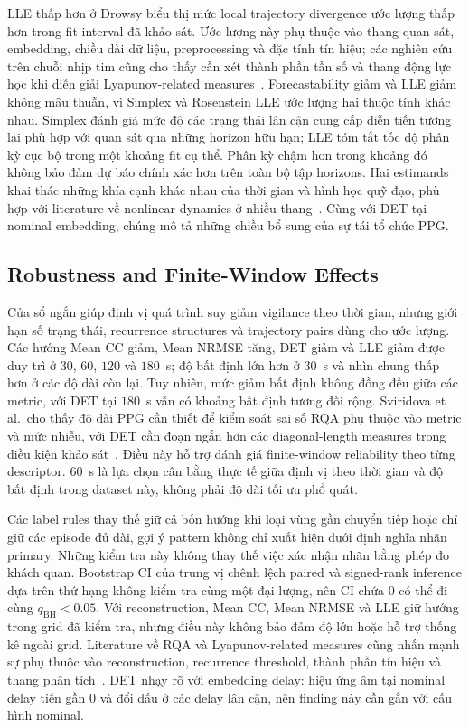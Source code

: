 LLE thấp hơn ở Drowsy biểu thị mức local trajectory divergence ước lượng thấp hơn trong fit interval đã khảo sát. Ước lượng này phụ thuộc vào thang quan sát, embedding, chiều dài dữ liệu, preprocessing và đặc tính tín hiệu; các nghiên cứu trên chuỗi nhịp tim cũng cho thấy cần xét thành phần tần số và thang động lực học khi diễn giải Lyapunov-related measures~\cite{yeragani2004,hu2009}. Forecastability giảm và LLE giảm không mâu thuẫn, vì Simplex và Rosenstein LLE ước lượng hai thuộc tính khác nhau. Simplex đánh giá mức độ các trạng thái lân cận cung cấp diễn tiến tương lai phù hợp với quan sát qua những horizon hữu hạn; LLE tóm tắt tốc độ phân kỳ cục bộ trong một khoảng fit cụ thể. Phân kỳ chậm hơn trong khoảng đó không bảo đảm dự báo chính xác hơn trên toàn bộ tập horizons. Hai estimands khai thác những khía cạnh khác nhau của thời gian và hình học quỹ đạo, phù hợp với literature về nonlinear dynamics ở nhiều thang~\cite{porta2015,hu2009}. Cùng với DET tại nominal embedding, chúng mô tả những chiều bổ sung của sự tái tổ chức PPG.

\subsection{Robustness and Finite-Window Effects}

Cửa sổ ngắn giúp định vị quá trình suy giảm vigilance theo thời gian, nhưng giới hạn số trạng thái, recurrence structures và trajectory pairs dùng cho ước lượng. Các hướng Mean CC giảm, Mean NRMSE tăng, DET giảm và LLE giảm được duy trì ở $30$, $60$, $120$ và $180$~s; độ bất định lớn hơn ở $30$~s và nhìn chung thấp hơn ở các độ dài còn lại. Tuy nhiên, mức giảm bất định không đồng đều giữa các metric, với DET tại $180$~s vẫn có khoảng bất định tương đối rộng. Sviridova et al.\ cho thấy độ dài PPG cần thiết để kiểm soát sai số RQA phụ thuộc vào metric và mức nhiễu, với DET cần đoạn ngắn hơn các diagonal-length measures trong điều kiện khảo sát~\cite{sviridova2022}. Điều này hỗ trợ đánh giá finite-window reliability theo từng descriptor. $60$~s là lựa chọn cân bằng thực tế giữa định vị theo thời gian và độ bất định trong dataset này, không phải độ dài tối ưu phổ quát.

Các label rules thay thế giữ cả bốn hướng khi loại vùng gần chuyển tiếp hoặc chỉ giữ các episode đủ dài, gợi ý pattern không chỉ xuất hiện dưới định nghĩa nhãn primary. Những kiểm tra này không thay thế việc xác nhận nhãn bằng phép đo khách quan. Bootstrap CI của trung vị chênh lệch paired và signed-rank inference dựa trên thứ hạng không kiểm tra cùng một đại lượng, nên CI chứa $0$ có thể đi cùng $q_{\mathrm{BH}}<0.05$. Với reconstruction, Mean CC, Mean NRMSE và LLE giữ hướng trong grid đã kiểm tra, nhưng điều này không bảo đảm độ lớn hoặc hỗ trợ thống kê ngoài grid. Literature về RQA và Lyapunov-related measures cũng nhấn mạnh sự phụ thuộc vào reconstruction, recurrence threshold, thành phần tín hiệu và thang phân tích~\cite{martingonzalez2018,yeragani2004,hu2009}. DET nhạy rõ với embedding delay: hiệu ứng âm tại nominal delay tiến gần $0$ và đổi dấu ở các delay lân cận, nên finding này cần gắn với cấu hình nominal.

